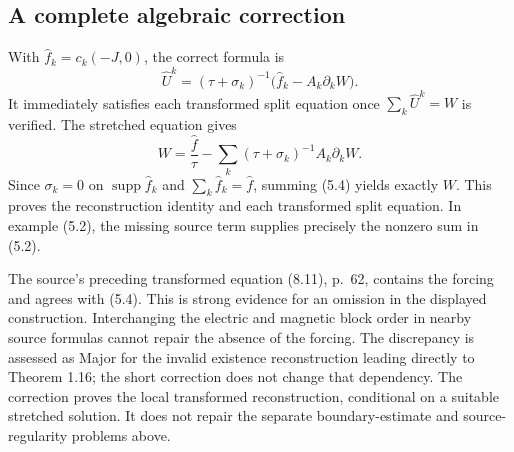 \documentclass[10pt]{article}
\begin{document}
\subsection*{A complete algebraic correction}
With \(\widehat f_k=c_k(-J,0)\), the correct formula is \[\boxed{\ \widehat U^k
     =(\tau+\sigma_k)^{-1}
        \bigl(\widehat f_k-A_k\partial_kW\bigr).\ }
 \tag{5.4}\] It immediately satisfies each transformed split equation once \(\sum_k\widehat U^k=W\) is verified. The stretched equation gives \[W=\frac{\widehat f}{\tau}
           -\sum_k(\tau+\sigma_k)^{-1}A_k\partial_kW.\] Since \(\sigma_k=0\) on \(\operatorname{supp}\widehat f_k\) and \(\sum_k\widehat f_k=\widehat f\), summing (5.4) yields exactly \(W\). This proves the reconstruction identity and each transformed split equation. In example (5.2), the missing source term supplies precisely the nonzero sum in (5.2).\par
The source’s preceding transformed equation (8.11), p. 62, contains the forcing and agrees with (5.4). This is strong evidence for an omission in the displayed construction. Interchanging the electric and magnetic block order in nearby source formulas cannot repair the absence of the forcing. The discrepancy is assessed as Major for the invalid existence reconstruction leading directly to Theorem 1.16; the short correction does not change that dependency. The correction proves the local transformed reconstruction, conditional on a suitable stretched solution. It does not repair the separate boundary-estimate and source-regularity problems above.\par
\end{document}
